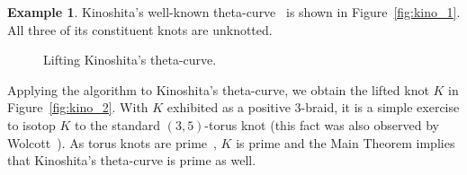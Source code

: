 \documentclass{amsart}
\numberwithin{equation}{section}
\theoremstyle{definition}
\newtheorem{example}[theorem]{Example}
\begin{document}
\begin{example}
Kinoshita's well-known theta-curve~\cite{Kin72} is shown in Figure~\ref{fig:kino_1}.
All three of its constituent knots are unknotted.
\begin{figure}[h!]
\centering
{}
\hspace{1.5cm}
\caption{Lifting Kinoshita's theta-curve.}
\label{fig:kino}
\end{figure}
Applying the algorithm to Kinoshita's theta-curve, we obtain the lifted knot $K$ in Figure~\ref{fig:kino_2}.
With $K$ exhibited as a positive $3$-braid, it is a simple exercise to isotop $K$ to the standard $(3,5)$-torus knot (this fact was also observed by Wolcott~\cite{Wol87}).
As torus knots are prime~\cite[p.~95]{BZ03}, $K$ is prime and the Main Theorem implies that Kinoshita's theta-curve is prime as well.
\end{example}
\end{document}
